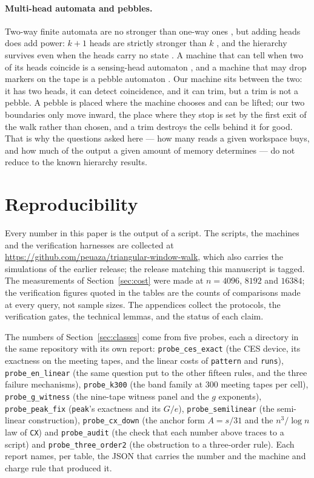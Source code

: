 \documentclass[11pt]{article}
\theoremstyle{remark}
\begin{document}
\paragraph{Multi-head automata and pebbles.} Two-way finite automata are no stronger than one-way ones
\citep{rabin-scott1959}, but adding heads does add power: $k+1$ heads are strictly stronger than $k$
\citep{rosenberg1966}, and the hierarchy survives even when the heads carry no state
\citep{kutrib-malcher2009}. A machine that can tell when two of its heads coincide is a sensing-head
automaton \citep{petersen1995}, and a machine that may drop markers on the tape is a pebble automaton
\citep{blum-hewitt1967}. Our machine sits between the two: it has two heads, it can detect coincidence,
and it can trim, but a trim is not a pebble. A pebble is placed where the machine chooses and can be lifted;
our two boundaries only move inward, the place where they stop is set by the first exit of the walk rather
than chosen, and a trim destroys the cells behind it for good. That is why the questions asked here --- how
many reads a given workspace buys, and how much of the output a given amount of memory determines --- do
not reduce to the known hierarchy results.

\section*{Reproducibility}

Every number in this paper is the output of a script. The scripts, the machines and the verification
harnesses are collected at \url{https://github.com/peuaza/triangular-window-walk}, which also carries
the simulations of the earlier release; the release matching this manuscript is tagged.
The measurements of Section~\ref{sec:cost} were made at $n=4096$, $8192$ and $16384$; the
verification figures quoted in the tables are the counts of comparisons made at every query, not
sample sizes. The appendices collect the protocols, the verification gates, the technical lemmas,
and the status of each claim.

The numbers of Section~\ref{sec:classes} come from five probes, each a directory in the same
repository with its own report: \texttt{probe\_ces\_exact} (the CES device, its exactness on the
meeting tapes, and the linear costs of \texttt{pattern} and \texttt{runs}),
\texttt{probe\_en\_linear} (the same question put to the other fifteen rules, and the three failure
mechanisms), \texttt{probe\_k300} (the band family at 300 meeting tapes per cell),
\texttt{probe\_g\_witness} (the nine-tape witness panel and the $g$ exponents),
\texttt{probe\_peak\_fix} (\texttt{peak}'s exactness and its $G/e$), \texttt{probe\_semilinear}
(the semi-linear construction), \texttt{probe\_cx\_down} (the anchor form $A=s/31$ and the
$n^{3}/\log n$ law of \texttt{CX}) and \texttt{probe\_audit} (the check that each number above traces to
a script) and
\texttt{probe\_three\_order2} (the obstruction to a three-order rule). Each report names, per table,
the JSON that carries the number and the machine and charge rule that produced it.
\end{document}
